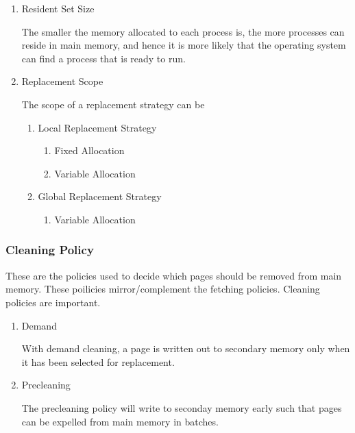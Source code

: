 \documentclass[11pt]{article}
\begin{document}
\begin{enumerate}
\item Resident Set Size
\label{sec:orgheadline51}

The smaller the memory allocated to each process is, the more processes
can reside in main memory, and hence it is more likely that the operating
system can find a process that is ready to run.

\item Replacement Scope
\label{sec:orgheadline57}

The scope of a replacement strategy can be 

\begin{enumerate}
\item Local Replacement Strategy
\label{sec:orgheadline54}

\begin{enumerate}
\item Fixed Allocation
\label{sec:orgheadline52}

\item Variable Allocation
\label{sec:orgheadline53}
\end{enumerate}

\item Global Replacement Strategy
\label{sec:orgheadline56}

\begin{enumerate}
\item Variable Allocation
\label{sec:orgheadline55}
\end{enumerate}
\end{enumerate}
\end{enumerate}

\subsubsection{Cleaning Policy}
\label{sec:orgheadline61}

These are the policies used to decide which pages should be removed
from main memory. These poilicies mirror/complement the fetching
policies. Cleaning policies are important.

\begin{enumerate}
\item Demand
\label{sec:orgheadline59}

With demand cleaning, a page is written out to secondary memory
only when it has been selected for replacement.

\item Precleaning
\label{sec:orgheadline60}

The precleaning policy will write to seconday memory early such
that pages can be expelled from main memory in batches.
\end{enumerate}
\end{document}
